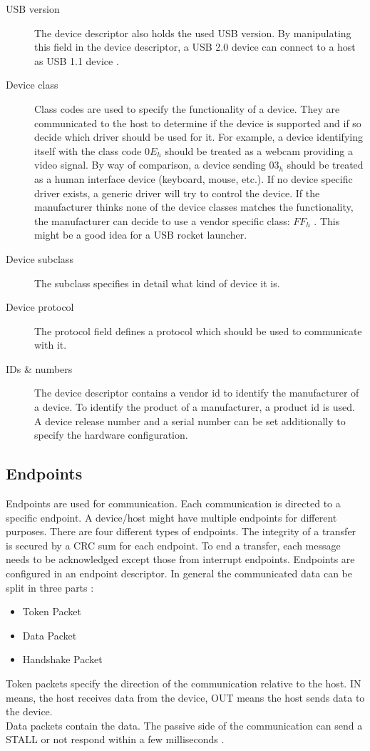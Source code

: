 \documentclass{acm_proc_article-sp}
\begin{document}
\begin{description}
\item[USB version]
The device descriptor also holds the used USB version.
By manipulating this field in the device descriptor, a USB 2.0 device can connect to a host as USB 1.1 device \cite{beyond}.

\item[Device class]
Class codes are used to specify the functionality of a device.
They are communicated to the host to determine if the device is supported and if so decide which driver should be used for it.
For example, a device identifying itself with the class code $0E_h$ should be treated as a webcam providing a video signal.
By way of comparison, a device sending $03_h$ should be treated as a human interface device (keyboard, mouse, etc.).
If no device specific driver exists, a generic driver will try to control the device.
If the manufacturer thinks none of the device classes matches the functionality, the manufacturer can decide to use a
vendor specific class: $FF_h$ \cite{axel}.
This might be a good idea for a USB rocket launcher.

\item[Device subclass]
The subclass specifies in detail what kind of device it is.

\item[Device protocol]
The protocol field defines a protocol which should be used to communicate with it.

\item [IDs \& numbers]
The device descriptor contains a vendor id to identify the manufacturer of a device.
To identify the product of a manufacturer, a product id is used.
A device release number and a serial number can be set additionally to specify the
hardware configuration.

\end{description}

\subsection{Endpoints}
Endpoints are used for communication.
Each communication is directed to a specific endpoint.
A device/host might have multiple endpoints for different purposes.
There are four different types of endpoints.
The integrity of a transfer is secured by a CRC sum for each endpoint.
To end a transfer, each message needs to be acknowledged except those from interrupt endpoints.
Endpoints are configured in an endpoint descriptor.
In general the communicated data can be split in three parts \cite{beyond}:
\begin{itemize}
\item Token Packet
\item Data Packet
\item Handshake Packet
\end{itemize}
Token packets specify the direction of the communication relative to the host.
IN means, the host receives data from the device, OUT means the host sends data to the device.\\
Data packets contain the data.
The passive side of the communication can send a STALL or not respond within a few milliseconds
\cite{beyond}.
\end{document}
